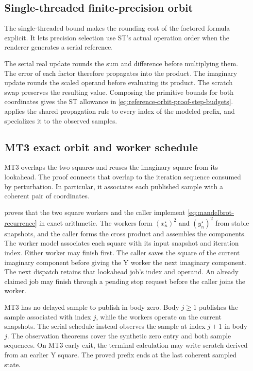 \subsection{Single-threaded finite-precision orbit}
\label{subsec:reference-orbit-proof-st-precision}

The single-threaded bound makes the rounding cost of the factored formula
explicit. It lets precision selection use ST's actual operation order when
the renderer generates a serial reference.

The serial real update rounds the sum and difference before multiplying them.
The error of each factor therefore propagates into the product. The imaginary
update rounds the scaled operand before evaluating its product. The scratch
swap preserves the resulting value. Composing the primitive bounds for both
coordinates gives the ST allowance in \eqref{eq:reference-orbit-proof-step-budgets}.
 applies the shared propagation rule
to every index of the modeled prefix, and
 specializes it to the observed samples.

\subsection{MT3 exact orbit and worker schedule}
\label{subsec:reference-orbit-proof-mt3-exact}

MT3 overlaps the two squares and reuses the imaginary square from its
lookahead. The proof connects that overlap to the iteration sequence
consumed by perturbation. In particular, it associates each published
sample with a coherent pair of coordinates.

 proves that the two square workers and the caller
implement \eqref{eq:mandelbrot-recurrence} in exact arithmetic. The workers
form $(x_n^\star)^2$ and $(y_n^\star)^2$ from stable snapshots, and the caller forms the
cross product and assembles the components. The worker model associates
each square with its input snapshot and iteration index. Either worker may
finish first. The caller saves the square of the current imaginary component
before giving the Y worker the next imaginary component. The next dispatch
retains that lookahead job's index and operand. An already claimed job may
finish through a pending stop request before the caller joins the worker.

MT3 has no delayed sample to publish in body zero. Body $j\ge1$
publishes the sample associated with index $j$, while the workers operate on the
current snapshots. The serial schedule instead observes the sample at index $j+1$
in body $j$. The observation theorems cover the synthetic zero entry and
both sample sequences. On MT3 early exit, the terminal calculation may
write scratch derived from an earlier Y square. The proved prefix ends
at the last coherent sampled state.

